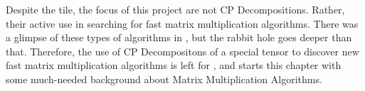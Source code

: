 
Despite the tile, the focus of this project are not CP Decompositions. Rather,
their active use in searching for fast matrix multiplication algorithms. There
was a glimpse of these types of algorithms in ,
but the rabbit hole goes deeper than that. Therefore, the use of CP
Decompositons of a special tensor to discover new fast matrix multiplication
algorithms is left for , and
 starts this chapter with some
much-needed background about Matrix Multiplication Algorithms.



